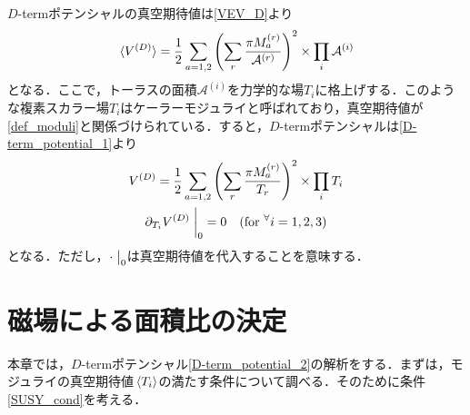 \documentclass[a4paper,uplatex,dvipdfmx]{jsarticle}
\theoremstyle{definition}
\begin{document}
$D$-termポテンシャルの真空期待値は\eqref{VEV_D}より
\begin{equation}
   \ev*{V^{(D)}}
   =
   \frac{1}{2}\sum_{a=1,2}
   \left(  
      \sum_{r}\frac{\pi M_{a}^{(r)}}{\mathcal{A}^{(r)}}
   \right)^2
   \times
   \prod_{i}\mathcal{A}^{(i)}
   \label{D-term_potential_1}
\end{equation}
となる．ここで，トーラスの面積$\mathcal{A}^{(i)}$を力学的な場$T_{i}$に格上げする．このような複素スカラー場$T_{i}$はケーラーモジュライと呼ばれており，真空期待値が\eqref{def_moduli}と関係づけられている．すると，$D$-termポテンシャルは\eqref{D-term_potential_1}より
\begin{gather}
   V^{(D)}
   =
   \frac{1}{2}
   \sum_{a=1,2}
   \left(  
      \sum_{r}\frac{\pi M_{a}^{(r)}}{T_{r}}
   \right)^2
   \times
   \prod_{i}T_{i}
   \label{D-term_potential_2}
   \\
   \partial_{T_{i}}V^{(D)}
   \left.\vphantom{\frac{1}{2}}\right|_{0}
   =
   0
   \quad
   (\text{for}\ ^{\forall}i=1,2,3)
   \label{SUSY_cond}
\end{gather}
となる．ただし，$\cdot\left.\vphantom{\frac{1}{2}}\right|_{0}$は真空期待値を代入することを意味する．


\section{磁場による面積比の決定}
\label{D-term_potential_analysis}

本章では，$D$-termポテンシャル\eqref{D-term_potential_2}の解析をする．まずは，モジュライの真空期待値$\ev*{T_{i}}$の満たす条件について調べる．そのために条件\eqref{SUSY_cond}を考える．
\end{document}
